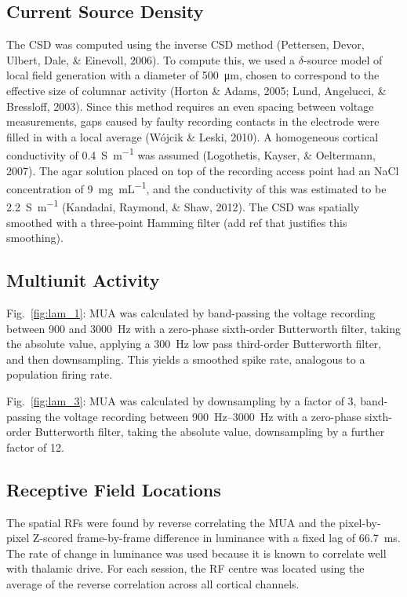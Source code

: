 \subsection{Current Source Density}
The \ac{CSD} was computed using the inverse \ac{CSD} method (Pettersen, Devor, Ulbert, Dale, \& Einevoll, 2006).
To compute this, we used a $\delta$-source model of local field generation with a diameter of \SI{500}{\micro\metre}, chosen to correspond to the effective size of columnar activity (Horton \& Adams, 2005; Lund, Angelucci, \& Bressloff, 2003).
Since this method requires an even spacing between voltage measurements, gaps caused by faulty recording contacts in the electrode were filled in with a local average (W\'ojcik \& Leski, 2010).
A homogeneous cortical conductivity of \SI{0.4}{\siemens\per\metre} was assumed (Logothetis, Kayser, \& Oeltermann, 2007).
The agar solution placed on top of the recording access point had an \ac{NaCl} concentration of \SI{9}{\mg\per\mL}, and the conductivity of this was estimated to be \SI{2.2}{\siemens\per\metre} (Kandadai, Raymond, \& Shaw, 2012).
The \ac{CSD} was spatially smoothed with a three-point Hamming filter (add ref that justifies this smoothing).

\subsection{Multiunit Activity}
Fig.~\ref{fig:lam_1}: \ac{MUA} was calculated by band-passing the voltage recording between 900 and \SI{3000}{Hz} with a zero-phase sixth-order Butterworth filter, taking the absolute value, applying a \SI{300}{Hz} low pass third-order Butterworth filter, and then downsampling.
This yields a smoothed spike rate, analogous to a population firing rate.

Fig.~\ref{fig:lam_3}: \ac{MUA} was calculated by downsampling by a factor of 3, band-passing the voltage recording between \SIrange{900}{3000}{Hz} with a zero-phase sixth-order Butterworth filter, taking the absolute value, downsampling by a further factor of 12.

\subsection{Receptive Field Locations}
The spatial \acp{RF} were found by reverse correlating the \ac{MUA} and the pixel-by-pixel Z-scored frame-by-frame difference in luminance with a fixed lag of \SI{66.7}{ms}.
The rate of change in luminance was used because it is known to correlate well with thalamic drive.
For each session, the \ac{RF} centre was located using the average of the reverse correlation across all cortical channels.

